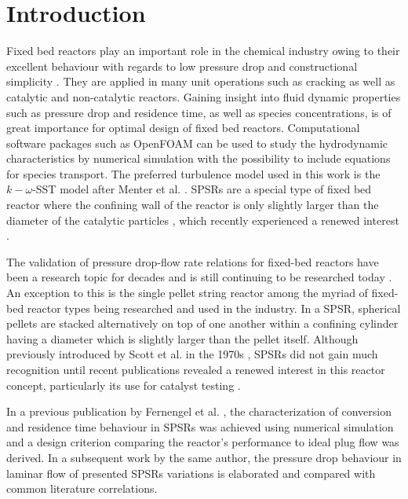 \chapter{Introduction}
\label{ch:01-Introduction}
Fixed bed reactors play an important role in the chemical industry owing to their excellent behaviour with regards to low pressure drop and constructional simplicity \cite{Warnecke2000}. They are applied in many unit operations such as cracking as well as catalytic and non-catalytic reactors. Gaining insight into fluid dynamic properties such as pressure drop and residence time, as well as species concentrations, is of great importance for optimal design of fixed bed reactors. Computational software packages such as OpenFOAM\textsuperscript{\textregistered} can be used to study the hydrodynamic characteristics by numerical simulation with the possibility to include equations for species transport. The preferred turbulence model used in this work is the $k-\omega$-SST model after Menter et al. \cite{Menter2001, Menter2003}. SPSRs are a special type of fixed bed reactor where the confining wall of the reactor is only slightly larger than the diameter of the catalytic particles \cite{Scott1974}, which recently experienced a renewed interest \cite{Klyushina2015,Moonen2017,Mueller2017}.

The validation of pressure drop-flow rate relations for fixed-bed reactors have been a research topic for decades and is still continuing to be researched today \cite{Erdim2015}. An exception to this is the single pellet string reactor among the myriad of fixed-bed reactor types being researched and used in the industry. In a SPSR, spherical pellets are stacked alternatively on top of one another within a confining cylinder having a diameter which is slightly larger than the pellet itself. Although previously introduced by Scott et al. in the 1970s \cite{Scott1974}, SPSRs did not gain much recognition until recent publications revealed a renewed interest in this reactor concept, particularly its use for catalyst testing \cite{Moonen2017,Mueller2017,Klyushina2015}.

In a previous publication by Fernengel et al. \cite{Fernengel2019}, the characterization of conversion and residence time behaviour in SPSRs was achieved using numerical simulation and a design criterion comparing the reactor's performance to ideal plug flow was derived. In a subsequent work by the same author, the pressure drop behaviour in laminar flow of presented SPSRs variations is elaborated and compared with common literature correlations.

